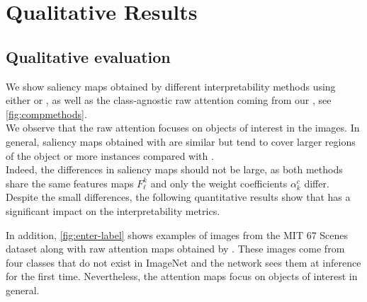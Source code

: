 \section{Qualitative Results}
\label{sec:ca_qual}
\subsection{Qualitative evaluation}
\label{subsec:vinspection}    
We show saliency maps obtained by different interpretability methods using either \gap or \Ours, as 
well as the class-agnostic raw attention coming from our \Ours, see \autoref{fig:compmethods}.\\


We observe that the raw attention focuses on objects of interest in the images. 
In general, saliency maps obtained with \Ours are similar but tend to cover larger regions of the 
object or more instances compared with \gap.\\
  
Indeed, the differences in saliency maps should not be large, as both methods share the same 
features maps $F^k_\ell$ and only the weight coefficients $\alpha^c_k$ differ.
Despite the small differences, the following quantitative results show that \Ours has a significant 
impact on the interpretability metrics.
   
In addition, \autoref{fig:enter-label} shows examples of images from the MIT 67 Scenes 
dataset \autocite{quattoni2009recognizing} along with raw attention maps obtained by \Ours. These 
images come from four classes that do not exist in ImageNet and the network sees them at inference for 
the first time. Nevertheless, the attention maps focus on objects of interest in general.
